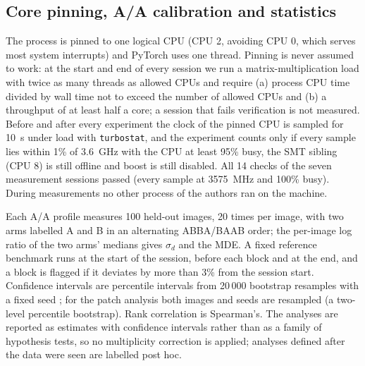 \documentclass[a4paper,fleqn]{cas-dc}
\begin{document}
\subsection{Core pinning, A/A calibration and statistics}
The process is pinned to one logical CPU (CPU 2, avoiding CPU 0, which serves most system interrupts) and PyTorch uses one thread. Pinning is never assumed to work: at the start and end of every session we run a matrix-multiplication load with twice as many threads as allowed CPUs and require (a) process CPU time divided by wall time not to exceed the number of allowed CPUs and (b) a throughput of at least half a core; a session that fails verification is not measured. Before and after every experiment the clock of the pinned CPU is sampled for 10~s under load with \texttt{turbostat}, and the experiment counts only if every sample lies within 1\% of 3.6~GHz with the CPU at least 95\% busy, the SMT sibling (CPU 8) is still offline and boost is still disabled. All 14 checks of the seven measurement sessions passed (every sample at 3575~MHz and 100\% busy). During measurements no other process of the authors ran on the machine.

Each A/A profile measures 100 held-out images, 20 times per image, with two arms labelled A and B in an alternating ABBA/BAAB order; the per-image log ratio of the two arms' medians gives $\hat\sigma_d$ and the MDE. A fixed reference benchmark runs at the start of the session, before each block and at the end, and a block is flagged if it deviates by more than 3\% from the session start. Confidence intervals are percentile intervals from 20\,000 bootstrap resamples with a fixed seed \cite{efron1979bootstrap}; for the patch analysis both images and seeds are resampled (a two-level percentile bootstrap). Rank correlation is Spearman's. The analyses are reported as estimates with confidence intervals rather than as a family of hypothesis tests, so no multiplicity correction is applied; analyses defined after the data were seen are labelled post hoc.
\end{document}
